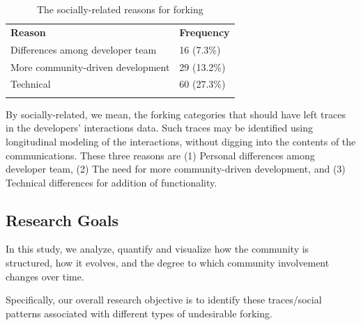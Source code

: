 \documentclass[12pt]{report}
\begin{document}
\begin{table}[!ht]
\centering
\caption[The socially-related forking reasons]{The socially-related reasons for forking }
\label{tableReasonsForForkingSociallyRelated}
\begin{tabular}{p{} p{}}
\hline\noalign{\smallskip}
\textbf{Reason} & \textbf{Frequency} \\
\noalign{\smallskip}\hline\noalign{\smallskip}
Differences among developer team &  16 (7.3\%)  \\ \hline
More community-driven development & 29 (13.2\%) \\ \hline
Technical & 60 (27.3\%)\\ 
\noalign{\smallskip}\hline
\end{tabular}
\end{table}

By socially-related, we mean, the forking categories that should have left traces in the developers' interactions data. Such traces may be identified using longitudinal modeling of the interactions, without digging into the contents of the communications. These three reasons are (1) Personal differences among developer team, (2) The need for more community-driven development, and (3) Technical differences for addition of functionality. 



\subsection{Research Goals}

In this study, we analyze, quantify and visualize how the community is structured, how it evolves, and the degree to which community involvement changes over time. 

Specifically, our overall research objective is to identify these traces/social patterns associated with different types of undesirable forking. 
\end{document}
